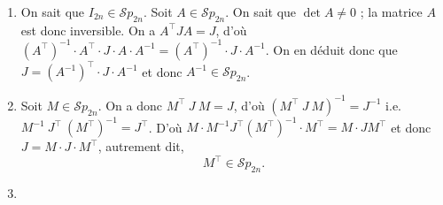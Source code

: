 \documentclass[a4paper]{article}
\begin{document}
\begin{enumerate}
		\item On sait que $I_{2n} \in \mathcal{S}p_{2n}$. Soit $A \in \mathcal{S}p_{2n}$. On sait que $\det A \neq 0$\/ ; la matrice $A$\/ est donc inversible.
			On a $A^\top J A = J$, d'où ${(A^\top)}^{-1}\cdot A^\top\cdot J\cdot A\cdot A^{-1} = {(A^\top)}^{-1}\cdot J\cdot A^{-1}$. On en déduit donc que $J = {(A^{-1})}^\top \cdot J\cdot A^{-1}$\/ et donc $A^{-1} \in \mathcal{S}p_{2n}$.
		\item Soit $M \in \mathcal{S}p_{2n}$. On a donc $M^\top\:J\:M = J$, d'où $(M^\top\:J\:M)^{-1} = J^{-1}$ i.e.\ $M^{-1}\:J^\top\:{(M^\top)}^{-1} = J^\top$. D'où $M\cdot M^{-1} J^\top (M^\top)^{-1} \cdot M^\top = M\cdot J M^\top$\/ et donc $J = M\cdot J\cdot M^\top$, autrement dit, \[\boxed{M^\top \in \mathcal{S}p_{2n}.}\]
		\item {}
	\end{enumerate}
\end{document}
